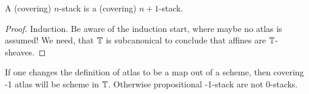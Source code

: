 \documentclass{article}
\newcommand{\red}[1]{{\color{red} #1}}
\begin{document}
\begin{lemma}{\label{lemma:succStab}}
    A  (covering) $n$-stack is a  (covering) $n+1$-stack.
\end{lemma}

\begin{proof}

    Induction. 	Be aware of the induction start, where maybe no atlas is assumed!
    We need, that $\mathbb{T}$ is subcanonical to conclude that affines are $\mathbb{T}$-sheaves.
\end{proof}
\begin{rmk}
    If one changes the definition of atlas to be a map out of a scheme, then covering -1 atlas will be scheme in $\mathbb{T}$. Otherwise propositional -1-stack are not 0-stacks.
\end{rmk}
\end{document}

